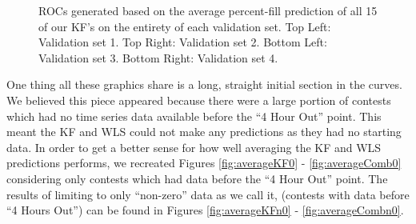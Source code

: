 \begin{figure}[h]
\caption{ROCs generated based on the average percent-fill prediction of all 15 of our KF's on the entirety of each validation set. Top Left: Validation set 1. Top Right: Validation set 2. Bottom Left: Validation set 3. Bottom Right: Validation set 4.}
\label{fig:averageComp0}
\end{figure}

One thing all these graphics share is a long, straight initial section in the curves. We believed this piece appeared because there were a large portion of contests which had no time series data available before the ``4 Hour Out'' point. This meant the KF and WLS could not make any predictions as they had no starting data. In order to get a better sense for how well averaging the KF and WLS predictions performs, we recreated Figures \ref{fig:averageKF0} - \ref{fig:averageComb0} considering only contests which had data before the ``4 Hour Out'' point. The results of limiting to only ``non-zero'' data as we call it, (contests with data before ``4 Hours Out'') can be found in Figures \ref{fig:averageKFn0} - \ref{fig:averageCombn0}.

\pagebreak

